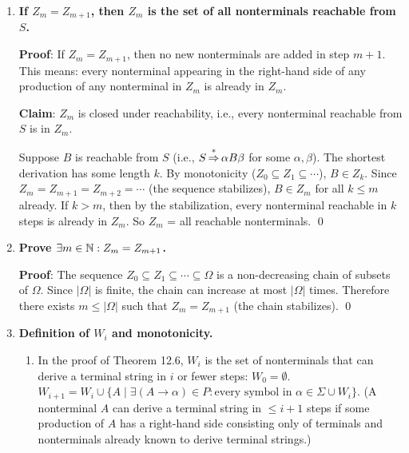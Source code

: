\begin{enumerate}[{12.}1. ]
\textbf{Proof}: $Z_0\subseteq Z_1$ since $Z_1 = Z_0\cup(\cdots) \supseteq Z_0$. By induction: if $Z_k\subseteq Z_{k+1}$, then $Z_{k+1}\subseteq Z_{k+2}$ since any nonterminal in $Z_{k+1}$ is reachable in $k+1$ steps, hence reachable in $k+2$ steps as well. The chain is bounded above by $\Omega$ (which is finite). \qed

\item \textbf{If $Z_m = Z_{m+1}$, then $Z_m$ is the set of all nonterminals reachable from $S$.}

\textbf{Proof}: If $Z_m = Z_{m+1}$, then no new nonterminals are added in step $m+1$. This means: every nonterminal appearing in the right-hand side of any production of any nonterminal in $Z_m$ is already in $Z_m$.

\textbf{Claim}: $Z_m$ is closed under reachability, i.e., every nonterminal reachable from $S$ is in $Z_m$.

Suppose $B$ is reachable from $S$ (i.e., $S\operatorname{\overset{*}{\Rightarrow}} \alpha B\beta$ for some $\alpha,\beta$). The shortest derivation has some length $k$. By monotonicity ($Z_0\subseteq Z_1\subseteq\cdots$), $B\in Z_k$. Since $Z_m=Z_{m+1}=Z_{m+2}=\cdots$ (the sequence stabilizes), $B\in Z_m$ for all $k\leq m$ already. If $k>m$, then by the stabilization, every nonterminal reachable in $k$ steps is already in $Z_m$. So $Z_m$ = all reachable nonterminals. \qed

\item \textbf{Prove $\exists m\in\mathbb{N}: Z_m = Z_{m+1}$.}

\textbf{Proof}: The sequence $Z_0\subseteq Z_1\subseteq\cdots\subseteq\Omega$ is a non-decreasing chain of subsets of $\Omega$. Since $|\Omega|$ is finite, the chain can increase at most $|\Omega|$ times. Therefore there exists $m\leq|\Omega|$ such that $Z_m=Z_{m+1}$ (the chain stabilizes). \qed

\item \textbf{Definition of $W_i$ and monotonicity.}

\begin{enumerate}
\item In the proof of Theorem 12.6, $W_i$ is the set of nonterminals that can derive a terminal string in $i$ or fewer steps:
$W_0 = \emptyset$.
$W_{i+1} = W_i \cup \{A \mid \exists (A\to\alpha)\in P: \text{every symbol in }\alpha\in\Sigma\cup W_i\}$.
(A nonterminal $A$ can derive a terminal string in $\leq i+1$ steps if some production of $A$ has a right-hand side consisting only of terminals and nonterminals already known to derive terminal strings.)


\end{enumerate}
\end{enumerate}
